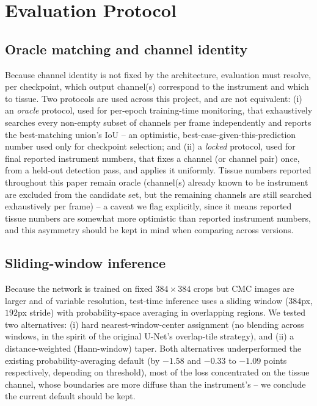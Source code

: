 \documentclass[conference]{IEEEtran}
\begin{document}
\section{Evaluation Protocol}
\label{sec:eval_protocol}

\subsection{Oracle matching and channel identity}
Because channel identity is not fixed by the architecture, evaluation
must resolve, per checkpoint, which output channel(s) correspond to the
instrument and which to tissue. Two protocols are used across this
project, and are not equivalent: (i) an \emph{oracle} protocol, used for
per-epoch training-time monitoring, that exhaustively searches every
non-empty subset of channels per frame independently and reports the
best-matching union's IoU -- an optimistic, best-case-given-this-prediction
number used only for checkpoint selection; and (ii) a \emph{locked}
protocol, used for final reported instrument numbers, that fixes a
channel (or channel pair) once, from a held-out detection pass, and
applies it uniformly. Tissue numbers reported throughout this paper
remain oracle (channel(s) already known to be instrument are excluded
from the candidate set, but the remaining channels are still searched
exhaustively per frame) -- a caveat we flag explicitly, since it means
reported tissue numbers are somewhat more optimistic than reported
instrument numbers, and this asymmetry should be kept in mind when
comparing across versions.

\subsection{Sliding-window inference}
\label{sec:sliding_window}
Because the network is trained on fixed $384\!\times\!384$ crops but CMC
images are larger and of variable resolution, test-time inference uses a
sliding window ($384$px, $192$px stride) with probability-space averaging
in overlapping regions. We tested two alternatives: (i) hard
nearest-window-center assignment (no blending across windows, in the
spirit of the original U-Net's overlap-tile strategy), and (ii) a
distance-weighted (Hann-window) taper. Both alternatives underperformed
the existing probability-averaging default (by $-1.58$ and $-0.33$ to
$-1.09$ points respectively, depending on threshold), most of the loss
concentrated on the tissue channel, whose boundaries are more diffuse
than the instrument's -- we conclude the current default should be kept.
\end{document}
